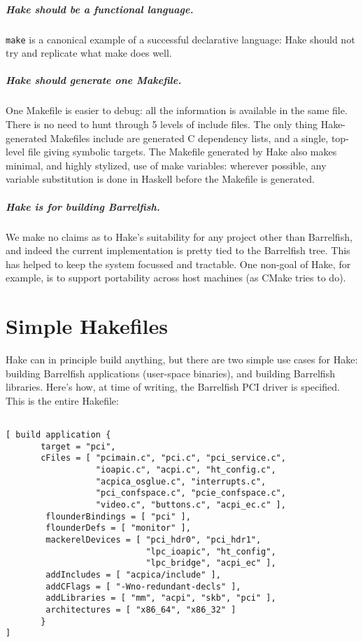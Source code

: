 \documentclass[a4paper,twoside]{report} %
\begin{document}
\paragraph{Hake should be a functional language.}  \texttt{make} is a
canonical example of a successful declarative language: Hake should
not try and replicate what make does well.  

\paragraph{Hake should generate one Makefile.} One Makefile is easier
to debug: all the information is available in the same file.  There is
no need to hunt through 5 levels of include files.  The only thing
Hake-generated Makefiles include are generated C dependency lists, and
a single, top-level file giving symbolic targets.  The Makefile
generated by Hake also makes minimal, and highly stylized, use of make
variables: wherever possible, any variable substitution is done in Haskell
before the Makefile is generated. 

\paragraph{Hake is for building Barrelfish.}  We make no claims as to
Hake's suitability for any project other than Barrelfish, and indeed
the current implementation is pretty tied to the Barrelfish tree.
This has helped to keep the system focussed and tractable.  One
non-goal of Hake, for example, is to support portability across host
machines (as CMake tries to do). 

\chapter{Simple Hakefiles}

Hake can in principle build anything, but there are two simple use
cases for Hake: building Barrelfish applications (user-space
binaries), and building Barrelfish libraries.  Here's how, at time of
writing, the Barrelfish PCI driver is specified.  This is the entire
Hakefile: 

\begin{verbatim}

[ build application { 
       target = "pci",
       cFiles = [ "pcimain.c", "pci.c", "pci_service.c", 
                  "ioapic.c", "acpi.c", "ht_config.c",
                  "acpica_osglue.c", "interrupts.c", 
                  "pci_confspace.c", "pcie_confspace.c",
                  "video.c", "buttons.c", "acpi_ec.c" ],
        flounderBindings = [ "pci" ],
        flounderDefs = [ "monitor" ],
        mackerelDevices = [ "pci_hdr0", "pci_hdr1",
                            "lpc_ioapic", "ht_config",
                            "lpc_bridge", "acpi_ec" ],
        addIncludes = [ "acpica/include" ],
        addCFlags = [ "-Wno-redundant-decls" ],
        addLibraries = [ "mm", "acpi", "skb", "pci" ],
        architectures = [ "x86_64", "x86_32" ]
       }
]
\end{verbatim}
\end{document}
